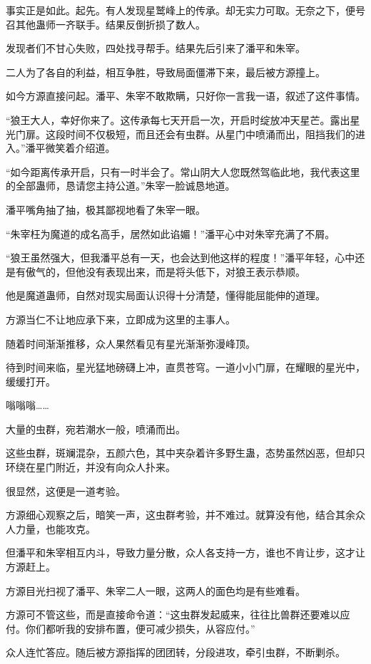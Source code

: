 \begin{this_body}
事实正是如此。起先。有人发现星鹫峰上的传承。却无实力可取。无奈之下，便号召其他蛊师一齐联手。结果反倒折损了数人。

发现者们不甘心失败，四处找寻帮手。结果先后引来了潘平和朱宰。

二人为了各自的利益，相互争胜，导致局面僵滞下来，最后被方源撞上。

如今方源直接问起。潘平、朱宰不敢欺瞒，只好你一言我一语，叙述了这件事情。

“狼王大人，幸好你来了。这传承每七天开启一次，开启时绽放冲天星芒。露出星光门扉。这段时间不仅极短，而且还会有虫群。从星门中喷涌而出，阻挡我们的进入。”潘平微笑着介绍道。

“如今距离传承开启，只有一时半会了。常山阴大人您既然驾临此地，我代表这里的全部蛊师，恳请您主持公道。”朱宰一脸诚恳地道。

潘平嘴角抽了抽，极其鄙视地看了朱宰一眼。

“朱宰枉为魔道的成名高手，居然如此谄媚！”潘平心中对朱宰充满了不屑。

“狼王虽然强大，但我潘平总有一天，也会达到他这样的程度！”潘平年轻，心中还是有傲气的，但他没有表现出来，而是将头低下，对狼王表示恭顺。

他是魔道蛊师，自然对现实局面认识得十分清楚，懂得能屈能伸的道理。

方源当仁不让地应承下来，立即成为这里的主事人。

随着时间渐渐推移，众人果然看见有星光渐渐弥漫峰顶。

待到时间来临，星光猛地磅礴上冲，直贯苍穹。一道小小门扉，在耀眼的星光中，缓缓打开。

嗡嗡嗡……

大量的虫群，宛若潮水一般，喷涌而出。

这些虫群，斑斓混杂，五颜六色，其中夹杂着许多野生蛊，态势虽然凶恶，但却只环绕在星门附近，并没有向众人扑来。

很显然，这便是一道考验。

方源细心观察之后，暗笑一声，这虫群考验，并不难过。就算没有他，结合其余众人力量，也能攻克。

但潘平和朱宰相互内斗，导致力量分散，众人各支持一方，谁也不肯让步，这才让方源赶上。

方源目光扫视了潘平、朱宰二人一眼，这两人的面色均是有些难看。

方源可不管这些，而是直接命令道：“这虫群发起威来，往往比兽群还要难以应付。你们都听我的安排布置，便可减少损失，从容应付。”

众人连忙答应。随后被方源指挥的团团转，分段进攻，牵引虫群，不断剿杀。


\end{this_body}
